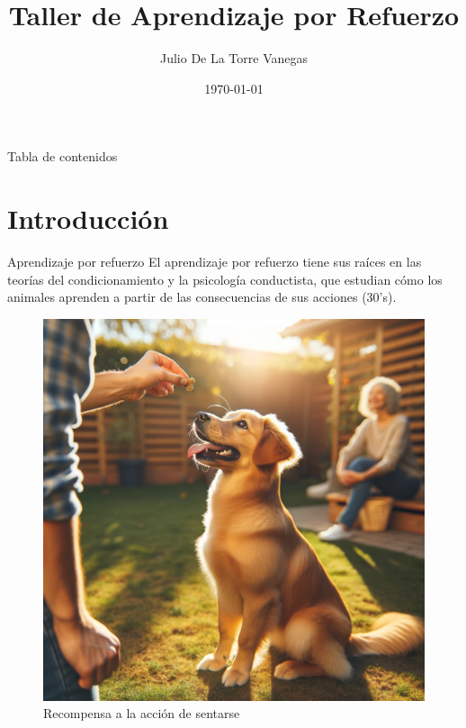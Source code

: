 \documentclass[aspectratio=169]{beamer}
\title[Taller RL]{Taller de Aprendizaje por Refuerzo}
\author{Julio De La Torre Vanegas}
\institute[CIMAT]{Centro de Investigación en Matemáticas}
\date[2024]{\footnotesize \today}
\begin{document}
    \frame{\titlepage}

    \begin{frame}{Tabla de contenidos}
            \tableofcontents
    \end{frame}

    \section{Introducción}

        \begin{frame}{Aprendizaje por refuerzo}
            El aprendizaje por refuerzo tiene sus raíces en las teorías del condicionamiento y la psicología conductista, que estudian cómo los animales aprenden a partir de las consecuencias de sus acciones (30's).

            \begin{figure}
                \centering
                \includegraphics[height=0.5\textheight]{imgs/animal.png}
                \caption{Recompensa a la acción de sentarse}
            \end{figure}
        \end{frame}
\end{document}
